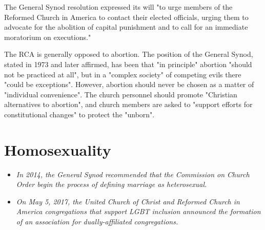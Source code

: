 The General Synod resolution expressed its will "to urge members of the
Reformed Church in America to contact their elected officials, urging
them to advocate for the abolition of capital punishment and to call for
an immediate moratorium on executions."

The RCA is generally opposed to abortion. The position of the General
Synod, stated in 1973 and later affirmed, has been that "in principle"
abortion "should not be practiced at all", but in a "complex society" of
competing evils there "could be exceptions". However, abortion should
never be chosen as a matter of "individual convenience". The church
personnel should promote "Christian alternatives to abortion", and
church members are asked to "support efforts for constitutional changes"
to protect the "unborn".

\section{Homosexuality}\label{homosexuality}

\begin{itemize}
\item
  \emph{In 2014, the General Synod recommended that the Commission on
  Church Order begin the process of defining marriage as heterosexual.}
\item
  \emph{On May 5, 2017, the United Church of Christ and Reformed Church
  in America congregations that support LGBT inclusion announced the
  formation of an association for dually-affiliated congregations.}
\end{itemize}

